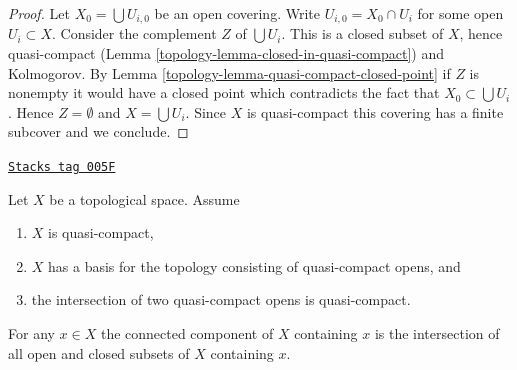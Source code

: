 \begin{proof}

Let $X_0 = \bigcup U_{i, 0}$ be an open covering.
Write $U_{i, 0} = X_0 \cap U_i$ for some open $U_i \subset X$.
Consider the complement $Z$ of $\bigcup U_i$. This is a closed subset of
$X$, hence quasi-compact (Lemma \ref{topology-lemma-closed-in-quasi-compact})
and Kolmogorov. By Lemma \ref{topology-lemma-quasi-compact-closed-point}
if $Z$ is nonempty it would have a closed
point which contradicts the fact that $X_0 \subset \bigcup U_i$.
Hence $Z = \emptyset$ and $X = \bigcup U_i$. Since $X$ is quasi-compact
this covering has a finite subcover and we conclude.
\end{proof}

\begin{lemma}
\label{topology-lemma-connected-component-intersection}
\href{https://stacks.math.columbia.edu/tag/005F}{\texttt{Stacks tag 005F}}

Let $X$ be a topological space.
Assume
\begin{enumerate}
\item $X$ is quasi-compact,
\item $X$ has a basis for the topology consisting of quasi-compact opens, and
\item the intersection of two quasi-compact opens is quasi-compact.
\end{enumerate}
For any $x \in X$ the connected component of $X$ containing
$x$ is the intersection of all open and closed subsets
of $X$ containing $x$.
\end{lemma}

